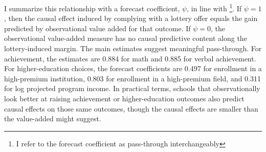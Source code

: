 \documentclass[a4paper, article, english, oneside, unknownkeysallowed, 12pt]{memoir}
\begin{document}
I summarize this relationship with a forecast coefficient, $\psi$, in line with \textcite{angrist_leveraging_2017}\footnote{I refer to the forecast coefficient as pass-through interchangeably}.
If $\psi=1$, then the causal effect induced by complying with a lottery offer equals the gain predicted by observational value added for that outcome.
If $\psi=0$, the observational value-added measure has no causal predictive content along the lottery-induced margin.
The main estimates suggest meaningful pass-through.
For achievement, the estimates are 0.884 for math and 0.885 for verbal achievement.
For higher-education choices, the forecast coefficients are 0.497 for enrollment in a high-premium institution, 0.803 for enrollment in a high-premium field, and 0.311 for log projected program income.
In practical terms, schools that observationally look better at raising achievement or higher-education outcomes also predict causal effects on those same outcomes, though the causal effects are smaller than the value-added might suggest.


\end{document}
